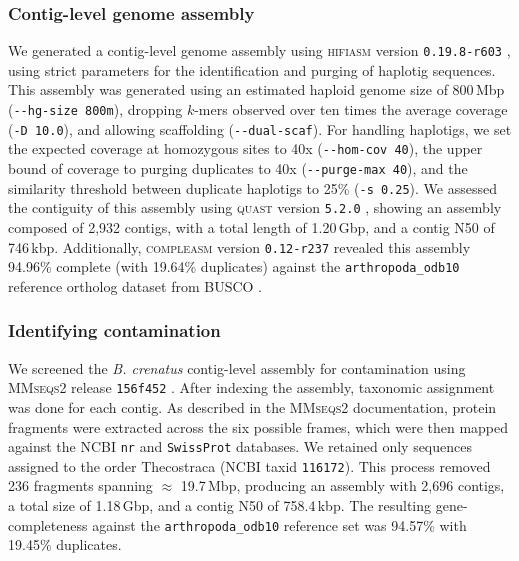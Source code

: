 \subsubsection*{Contig-level genome assembly}

We generated a contig-level genome assembly using \textsc{hifiasm} version
\texttt{0.19.8-r603} \citep{cheng_haplotype-resolved_2021,cheng_haplotype-resolved_2022},
using strict parameters for the identification and purging of haplotig sequences.
This assembly was generated using an estimated haploid genome size of 800\,Mbp
(\texttt{-{}-hg-size 800m}), dropping $k$-mers observed over ten times the average coverage
(\texttt{-D 10.0}), and allowing scaffolding (\texttt{-{}-dual-scaf}).
For handling haplotigs, we set the expected coverage at homozygous sites to
40x (\texttt{-{}-hom-cov 40}), the upper bound of coverage to purging duplicates to 40x
(\texttt{-{}-purge-max 40}), and the similarity threshold between duplicate haplotigs
to 25\% (\texttt{-s 0.25}).
We assessed the contiguity of this assembly using \textsc{quast} version \texttt{5.2.0}
\citep{gurevich_quast_2013}, showing an assembly composed of 2{,}932 contigs, with a total
length of 1.20\,Gbp, and a contig N50 of 746\,kbp.
Additionally, \textsc{compleasm} version \texttt{0.12-r237} \citep{huang_compleasm_2023}
revealed this assembly 94.96\% complete (with 19.64\% duplicates) against the
\texttt{arthropoda\_odb10} reference ortholog dataset from \textsc{BUSCO}
\citep{simao_busco_2015,manni_busco_2021,tegenfeldt_orthodb_2025}.

\subsubsection*{Identifying contamination}

We screened the \textit{B. crenatus} contig-level assembly for contamination using
\textsc{MMseqs2} release \texttt{15\-6f452} \citep{steinegger_mmseqs2_2017}.
After indexing the assembly, taxonomic assignment was done for each contig.
As described in the \textsc{MMseqs2} documentation, protein fragments were extracted
across the six possible frames, which were then mapped against the NCBI \texttt{nr} and
\texttt{SwissProt} databases.
We retained only sequences assigned to the order Thecostraca (NCBI taxid
\texttt{116172}).
This process removed 236 fragments spanning $\approx$ 19.7\,Mbp, producing an assembly
with 2{,}696 contigs, a total size of 1.18\,Gbp, and a contig N50 of 758.4\,kbp.
The resulting gene-completeness against the \texttt{arthropoda\_odb10} reference
set was 94.57\% with 19.45\% duplicates.


